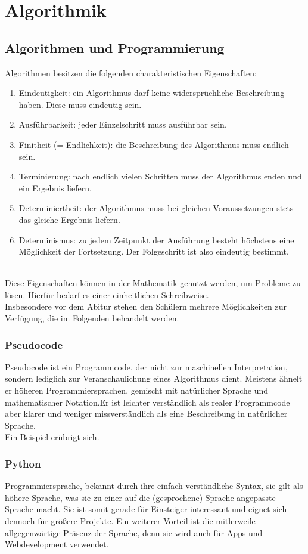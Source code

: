 \chapter{Algorithmik}
\section{Algorithmen und Programmierung}
\begin{Definition}
	Algorithmen besitzen die folgenden charakteristischen Eigenschaften:
	\begin{enumerate}
		\item Eindeutigkeit: ein Algorithmus darf keine widersprüchliche Beschreibung haben. Diese muss eindeutig sein.
		\item Ausführbarkeit: jeder Einzelschritt muss ausführbar sein.
		\item Finitheit (= Endlichkeit): die Beschreibung des Algorithmus muss endlich sein.
		\item Terminierung: nach endlich vielen Schritten muss der Algorithmus enden und ein Ergebnis liefern.
		\item Determiniertheit: der Algorithmus muss bei gleichen Voraussetzungen stets das gleiche Ergebnis liefern.
		\item   Determinismus: zu jedem Zeitpunkt der Ausführung besteht höchstens eine Möglichkeit der Fortsetzung. Der Folgeschritt ist also eindeutig bestimmt.
	\end{enumerate}
\end{Definition}
\\
Diese Eigenschaften können in der Mathematik genutzt werden, um Probleme zu lösen. Hierfür bedarf es einer einheitlichen Schreibweise.\\
Insbesondere vor dem Abitur stehen den Schülern mehrere Möglichkeiten zur Verfügung, die im Folgenden behandelt werden.
\subsection{Pseudocode}
Pseudocode ist ein Programmcode, der nicht zur maschinellen Interpretation, sondern lediglich zur Veranschaulichung eines Algorithmus dient. Meistens ähnelt er höheren Programmiersprachen, gemischt mit natürlicher Sprache und mathematischer Notation.Er ist leichter verständlich als realer Programmcode aber klarer und weniger missverständlich als eine Beschreibung in natürlicher Sprache.\\
Ein Beispiel erübrigt sich.
\subsection{Python}
Programmiersprache, bekannt durch ihre einfach verständliche Syntax, sie gilt als höhere Sprache, was sie zu einer auf die (gesprochene) Sprache angepasste Sprache macht. Sie ist somit gerade für Einsteiger interessant und eignet sich dennoch für größere Projekte. Ein weiterer Vorteil ist die mitlerweile allgegenwärtige Präsenz der Sprache, denn sie wird auch für Apps und Webdevelopment verwendet.\\

